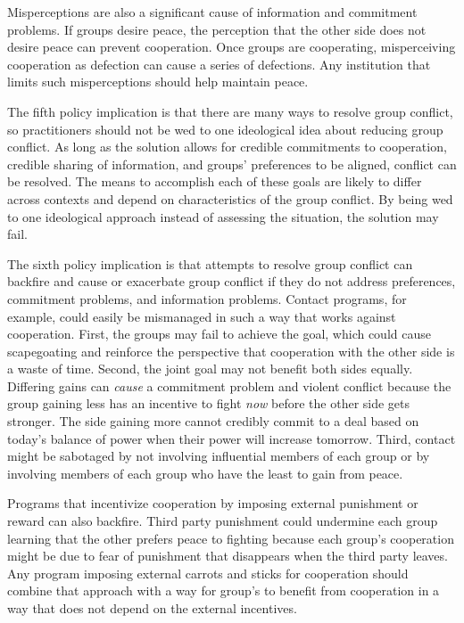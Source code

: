 \documentclass[11pt]{article}
\begin{document}
Misperceptions are also a significant cause of information and
commitment problems. If groups desire peace, the perception that the
other side does not desire peace can prevent cooperation. Once groups
are cooperating, misperceiving cooperation as defection can cause a
series of defections. Any institution that limits such misperceptions
should help maintain peace.

The fifth policy implication is that there are many ways to resolve
group conflict, so practitioners should not be wed to one ideological
idea about reducing group conflict. As long as the solution allows for
credible commitments to cooperation, credible sharing of information,
and groups' preferences to be aligned, conflict can be resolved. The
means to accomplish each of these goals are likely to differ across
contexts and depend on characteristics of the group conflict. By being
wed to one ideological approach instead of assessing the situation, the
solution may fail.

The sixth policy implication is that attempts to resolve group conflict
can backfire and cause or exacerbate group conflict if they do not
address preferences, commitment problems, and information problems.
Contact programs, for example, could easily be mismanaged in such a way
that works against cooperation. First, the groups may fail to achieve
the goal, which could cause scapegoating and reinforce the perspective
that cooperation with the other side is a waste of time. Second, the
joint goal may not benefit both sides equally. Differing gains can
\emph{cause} a commitment problem and violent conflict because the group
gaining less has an incentive to fight \emph{now} before the other side
gets stronger. The side gaining more cannot credibly commit to a deal
based on today's balance of power when their power will increase
tomorrow. Third, contact might be sabotaged by not involving influential
members of each group or by involving members of each group who have the
least to gain from peace.

Programs that incentivize cooperation by imposing external punishment or
reward can also backfire. Third party punishment could undermine each
group learning that the other prefers peace to fighting because each
group's cooperation might be due to fear of punishment that disappears
when the third party leaves. Any program imposing external carrots and
sticks for cooperation should combine that approach with a way for
group's to benefit from cooperation in a way that does not depend on the
external incentives.
\end{document}
